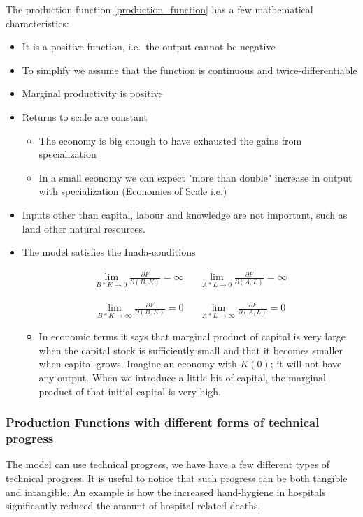The production function \ref{production_function} has a few mathematical characteristics:
\begin{itemize}
\item
  It is a positive function, i.e.~the output cannot be negative
\item
  To simplify we assume that the function is continuous and
  twice-differentiable
\item
  Marginal productivity is positive
\item
  Returns to scale are constant
  \begin{itemize}
  \item The economy is big enough to have exhausted the gains from specialization
  \item In a small economy we can expect "more than double" increase in output with specialization (Economies of Scale i.e.)
  \end{itemize}
  \item Inputs other than capital, labour and knowledge are not important, such as land other natural resources. 
\item
  The model satisfies the Inada-conditions
 
\begin{align*}
\lim_{B * K \rightarrow 0 } \frac{\partial F}{\partial (B,K)}= \infty   
&&
\lim_{A * L \rightarrow 0 } \frac{\partial F}{\partial (A,L)}= \infty
\end{align*}

\begin{align*}
\lim_{B * K \rightarrow \infty } \frac{\partial F}{\partial (B,K)}= 0    
&&
\lim_{A * L \rightarrow \infty } \frac{\partial F}{\partial (A,L)}= 0
\end{align*}

  \begin{itemize}
  \item
    In economic terms it says that marginal product of capital is very large when the capital stock is sufficiently small and that it becomes smaller when capital grows. Imagine an economy with $K(0)$; it will not have any output. When we introduce a little bit of capital, the marginal product of that initial capital is very high. 
  \end{itemize}
\end{itemize}

\subsubsection*{Production Functions with different forms of technical progress}
The model can use technical progress, we have have a few different types of technical progress. It is useful to notice that such progress can be both tangible and intangible. An example is how the increased hand-hygiene in hospitals significantly reduced the amount of hospital related deaths. 

